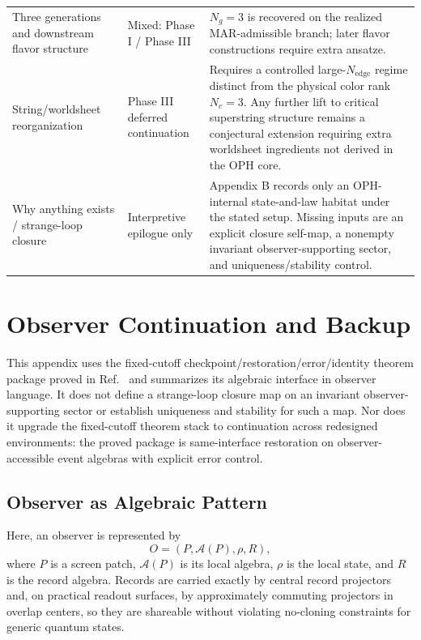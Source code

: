\begin{longtable}{p{} p{} p{}}
Three generations and downstream flavor structure & Mixed: Phase I / Phase III & \(N_g=3\) is recovered on the realized MAR-admissible branch; later flavor constructions require extra ansatze. \\
String/worldsheet reorganization & Phase III deferred continuation & Requires a controlled large-\(N_{\mathrm{edge}}\) regime distinct from the physical color rank \(N_c=3\). Any further lift to critical superstring structure remains a conjectural extension requiring extra worldsheet ingredients not derived in the OPH core. \\
Why anything exists / strange-loop closure & Interpretive epilogue only & Appendix B records only an OPH-internal state-and-law habitat under the stated setup. Missing inputs are an explicit closure self-map, a nonempty invariant observer-supporting sector, and uniqueness/stability control. \\
\end{longtable}

\section{Observer Continuation and Backup}

This appendix uses the fixed-cutoff checkpoint/restoration/error/identity theorem package proved
in Ref.~\cite{ophmicrophysics} and summarizes its algebraic interface in observer language. It
does not define a strange-loop closure map on an invariant observer-supporting sector or establish
uniqueness and stability for such a map. Nor does it upgrade the fixed-cutoff theorem stack to
continuation across redesigned environments: the proved package is same-interface restoration on
observer-accessible event algebras with explicit error control.

\subsection{Observer as Algebraic Pattern}

Here, an observer is represented by
\[
O=(P,\mathcal{A}(P),\rho,R),
\]
where \(P\) is a screen patch, \(\mathcal{A}(P)\) is its local algebra, \(\rho\) is the local
state, and \(R\) is the record algebra. Records are carried exactly by central record projectors
and, on practical readout surfaces, by approximately commuting projectors in overlap centers, so
they are shareable without violating no-cloning constraints for generic quantum states.

